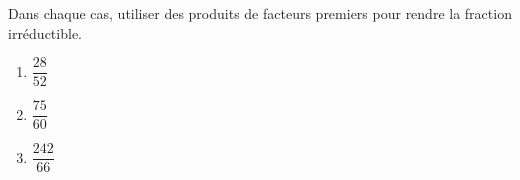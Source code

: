\documentclass[exercice]{thedocument}%
\begin{document}
%
Dans chaque cas, utiliser des produits de facteurs premiers pour rendre la fraction
irréductible.
\begin{enumerate}
    \item $\dfrac{28}{52}$
    \item $\dfrac{75}{60}$
    \item $\dfrac{242}{66}$
\end{enumerate}
\end{document}
